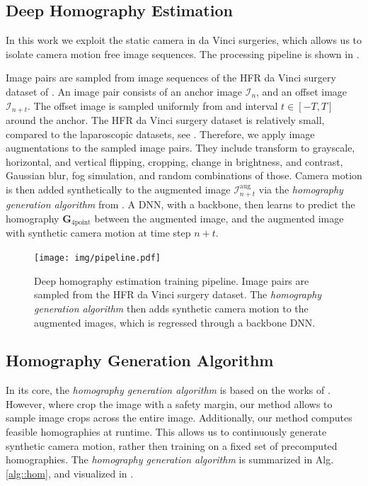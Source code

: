 \subsection{Deep Homography Estimation}

In this work we exploit the static camera in da Vinci surgeries, which allows us to isolate camera motion free image sequences. The processing pipeline is shown in .

Image pairs are sampled from image sequences of the HFR da Vinci surgery dataset of . An image pair consists of an anchor image $\mathcal{I}_n$, and an offset image $\mathcal{I}_{n+t}$. The offset image is sampled uniformly from and interval $t\in[-T,T]$ around the anchor. The HFR da Vinci surgery dataset is relatively small, compared to the laparoscopic datasets, see . Therefore, we apply image augmentations to the sampled image pairs. They include transform to grayscale, horizontal, and vertical flipping, cropping, change in brightness, and contrast, Gaussian blur, fog simulation, and random combinations of those. Camera motion is then added synthetically to the augmented image $\mathcal{I}^\text{aug}_{n+t}$ via the \textit{homography generation algorithm} from . A DNN, with a backbone, then learns to predict the homography $\mathbf{G}_{4\text{point}}$ between the augmented image, and the augmented image with synthetic camera motion at time step $n+t$.

\begin{landscape}
\begin{figure}
    \centering
    \texttt{[image: img/pipeline.pdf]}
    \caption{Deep homography estimation training pipeline. Image pairs are sampled from the HFR da Vinci surgery dataset. The \textit{homography generation algorithm} then adds synthetic camera motion to the augmented images, which is regressed through a backbone DNN.}
    \label{c2:fig:hom}
\end{figure}
\end{landscape}

\subsection{Homography Generation Algorithm}
\label{c2:sec:hom_gen}

In its core, the \textit{homography generation algorithm} is based on the works of \cite{detone2016deep}. However, where \citeauthor{detone2016deep} crop the image with a safety margin, our method allows to sample image crops across the entire image. Additionally, our method computes feasible homographies at runtime. This allows us to continuously generate synthetic camera motion, rather then training on a fixed set of precomputed homographies. The \textit{homography generation algorithm} is summarized in Alg.\,\ref{alg::hom}, and visualized in .

